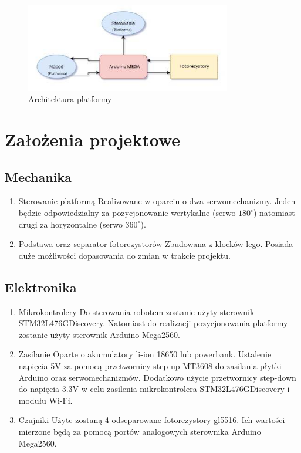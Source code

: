 \documentclass[10pt, a4paper]{article}
\begin{document}
	\begin{figure}[H]
		\centering
		\includegraphics[width=0.8\textwidth]{diag2.jpg}
		\caption{Architektura platformy}
		\label{fig:Architektura platformy}
	\end{figure}
\section{Założenia projektowe}

\subsection{Mechanika}
\begin{enumerate}
	
	\item Sterowanie platformą
	\newline
	Realizowane w oparciu o dwa serwomechanizmy. Jeden będzie odpowiedzialny za pozycjonowanie wertykalne (serwo $180^\circ$) natomiast drugi za horyzontalne (serwo $360^\circ$).
	
	\item Podstawa oraz separator fotorezystorów
	\newline
	Zbudowana z klocków lego. Posiada duże możliwości dopasowania do zmian w trakcie projektu.
	
\end{enumerate}

\subsection{Elektronika}
\begin{enumerate}
	\item Mikrokontrolery
	\newline
	Do sterowania robotem zostanie użyty sterownik STM32L476GDiscovery. Natomiast do realizacji pozycjonowania platformy zostanie użyty sterownik Arduino Mega2560.
	
	\item Zasilanie
	\newline
	Oparte o akumulatory li-ion 18650 lub powerbank. Ustalenie napięcia 5V za pomocą przetwornicy step-up MT3608 do zasilania płytki Arduino oraz serwomechanizmów. Dodatkowo użycie przetwornicy step-down do napięcia 3.3V w celu zasilenia mikrokontrolera STM32L476GDiscovery i modułu Wi-Fi.
	
	\item Czujniki
	\newline
	Użyte zostaną 4 odseparowane fotorezystory gl5516. Ich wartości mierzone będą za pomocą portów analogowych  sterownika Arduino Mega2560.
\end{enumerate}
\end{document}
